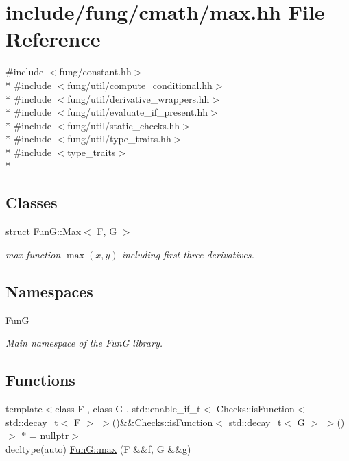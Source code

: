 \hypertarget{max_8hh}{}\section{include/fung/cmath/max.hh File Reference}
\label{max_8hh}
{\ttfamily \#include $<$fung/constant.\+hh$>$}\\*
{\ttfamily \#include $<$fung/util/compute\+\_\+conditional.\+hh$>$}\\*
{\ttfamily \#include $<$fung/util/derivative\+\_\+wrappers.\+hh$>$}\\*
{\ttfamily \#include $<$fung/util/evaluate\+\_\+if\+\_\+present.\+hh$>$}\\*
{\ttfamily \#include $<$fung/util/static\+\_\+checks.\+hh$>$}\\*
{\ttfamily \#include $<$fung/util/type\+\_\+traits.\+hh$>$}\\*
{\ttfamily \#include $<$type\+\_\+traits$>$}\\*
\subsection*{Classes}
\begin{DoxyCompactItemize}
\item 
struct \hyperlink{structFunG_1_1Max}{Fun\+G\+::\+Max$<$ F, G $>$}
\begin{DoxyCompactList}\small\item\em max function $ \max(x,y) $ including first three derivatives. \end{DoxyCompactList}\end{DoxyCompactItemize}
\subsection*{Namespaces}
\begin{DoxyCompactItemize}
\item 
 \hyperlink{namespaceFunG}{FunG}
\begin{DoxyCompactList}\small\item\em Main namespace of the FunG library. \end{DoxyCompactList}\end{DoxyCompactItemize}
\subsection*{Functions}
\begin{DoxyCompactItemize}
\item 
{\footnotesize template$<$class F , class G , std\+::enable\+\_\+if\+\_\+t$<$ Checks\+::is\+Function$<$ std\+::decay\+\_\+t$<$ F $>$ $>$()\&\&\+Checks\+::is\+Function$<$ std\+::decay\+\_\+t$<$ G $>$ $>$() $>$ $\ast$  = nullptr$>$ }\\decltype(auto) \hyperlink{group__CMathGroup_ga012e475862c540ed8a2a083414cb2917}{Fun\+G\+::max} (F \&\&f, G \&\&g)
\end{DoxyCompactItemize}
